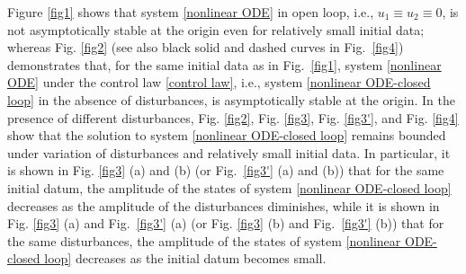 \documentclass[onecolumn]{autart}
\newenvironment{proof of Prop.ODE}{{\it Proof of Proposition~\ref{Prop.ODE}:\enspace}}{\hfill $\blacksquare$\par}
\newenvironment{proof of PDE}{{\it Proof of Proposition \ref{Prop.8}:\enspace}}{\hfill $\blacksquare$\par}
\begin{document}
{	%
	Figure \ref{fig1} shows that    system \eqref{nonlinear ODE} in open loop, i.e., $u_1\equiv u_2\equiv 0$, is not asymptotically stable at the origin even for   relatively small  initial data; whereas Fig. \ref{fig2}  (see also black solid and dashed {curves} in Fig.~\ref{fig4}) demonstrates that,  for the same initial data as in  Fig.~\ref{fig1},      system \eqref{nonlinear ODE} under the control law \eqref{control law}, i.e., system  \eqref{nonlinear ODE-closed loop} in the absence of disturbances, is  asymptotically stable at the origin.
	In the presence of different disturbances,  Fig. \ref{fig2},  Fig. \ref{fig3},  Fig. \ref{fig3'},  and Fig. \ref{fig4}   show that the solution {to} {system}  \eqref{nonlinear ODE-closed loop}  remains bounded under  variation of  disturbances and relatively small initial data.
	In particular, it is shown in  Fig. \ref{fig3} (a) and (b) (or Fig.~\ref{fig3'} (a) and (b)) that for the same initial datum,   the amplitude  of the states  of   system \eqref{nonlinear ODE-closed loop} decreases as the amplitude of the disturbances diminishes, while it is shown in  Fig. \ref{fig3} (a) and Fig.~\ref{fig3'} (a)  (or Fig. \ref{fig3} (b) and Fig.~\ref{fig3'} (b)) that for the same disturbances,  the amplitude  of the states  of   system \eqref{nonlinear ODE-closed loop} decreases as the  initial datum becomes small.
}
\end{document}
